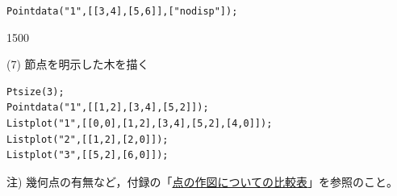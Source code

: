 \documentclass[papersize,a4paper,12pt,uplatex]{jsarticle}
\begin{document}
\begin{description}
\hspace{10mm} \verb|Pointdata("1",[[3,4],[5,6]],["nodisp"]);|

\begin{layer}{150}{0}
\end{layer}

(7) 節点を明示した木を描く
\begin{verbatim}
Ptsize(3); 
Pointdata("1",[[1,2],[3,4],[5,2]]); 
Listplot("1",[[0,0],[1,2],[3,4],[5,2],[4,0]]); 
Listplot("2",[[1,2],[2,0]]); 
Listplot("3",[[5,2],[6,0]]);
\end{verbatim}

注) 幾何点の有無など，付録の「\hyperlink{mkpttable}{点の作図についての比較表}」を参照のこと。












\end{description}
\end{document}
